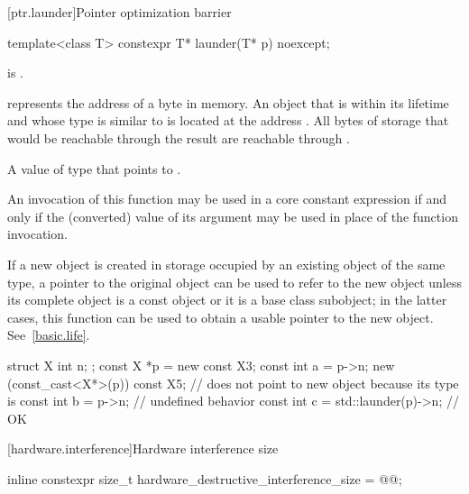 [ptr.launder]{Pointer optimization barrier}

%
\begin{itemdecl}
template<class T> constexpr T* launder(T* p) noexcept;
\end{itemdecl}

\begin{itemdescr}
\pnum
\mandates
{} is .

\pnum
\expects
{} represents the address  of a byte in memory.
An object  that is within its lifetime
and whose type is similar to 
is located at the address .
All bytes of storage that would be
reachable through the result
are reachable through .

\pnum
\returns
A value of type  that points to .

\pnum
\remarks
An invocation of this function
may be used in a core constant expression
if and only if the (converted) value of its argument
may be used in place of the function invocation.

\pnum
\begin{note}
If a new object is created
in storage occupied by an existing object of the same type,
a pointer to the original object
can be used to refer to the new object
unless its complete object is a const object or it is a base class subobject;
in the latter cases,
this function can be used to obtain a usable pointer to the new object.
See~\ref{basic.life}.
\end{note}

\pnum
\begin{example}
\begin{codeblock}
struct X { int n; };
const X *p = new const X{3};
const int a = p->n;
new (const_cast<X*>(p)) const X{5}; //  does not point to new object because its type is 
const int b = p->n;                 // undefined behavior
const int c = std::launder(p)->n;   // OK
\end{codeblock}
\end{example}
\end{itemdescr}

[hardware.interference]{Hardware interference size}

%
\begin{itemdecl}
inline constexpr size_t hardware_destructive_interference_size = @\impdef{}@;
\end{itemdecl}

